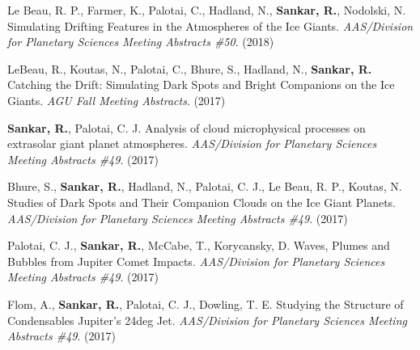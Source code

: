 \item Le Beau, R. P., Farmer, K., Palotai, C., Hadland, N., {\bf Sankar, R.}, Nodolski, N. Simulating Drifting Features in the Atmospheres of the Ice Giants. {\it AAS/Division for Planetary Sciences Meeting Abstracts \#50}. (2018)
\item LeBeau, R., Koutas, N., Palotai, C., Bhure, S., Hadland, N., {\bf Sankar, R.} Catching the Drift: Simulating Dark Spots and Bright Companions on the Ice Giants. {\it AGU Fall Meeting Abstracts}. (2017)
\item {\bf Sankar, R.}, Palotai, C. J. Analysis of cloud microphysical processes on extrasolar giant planet atmospheres. {\it AAS/Division for Planetary Sciences Meeting Abstracts \#49}. (2017)
\item Bhure, S., {\bf Sankar, R.}, Hadland, N., Palotai, C. J., Le Beau, R. P., Koutas, N. Studies of Dark Spots and Their Companion Clouds on the Ice Giant Planets. {\it AAS/Division for Planetary Sciences Meeting Abstracts \#49}. (2017)
\item Palotai, C. J., {\bf Sankar, R.}, McCabe, T., Korycansky, D. Waves, Plumes and Bubbles from Jupiter Comet Impacts. {\it AAS/Division for Planetary Sciences Meeting Abstracts \#49}. (2017)
\item Flom, A., {\bf Sankar, R.}, Palotai, C. J., Dowling, T. E. Studying the Structure of Condensables Jupiter's 24deg Jet. {\it AAS/Division for Planetary Sciences Meeting Abstracts \#49}. (2017)
